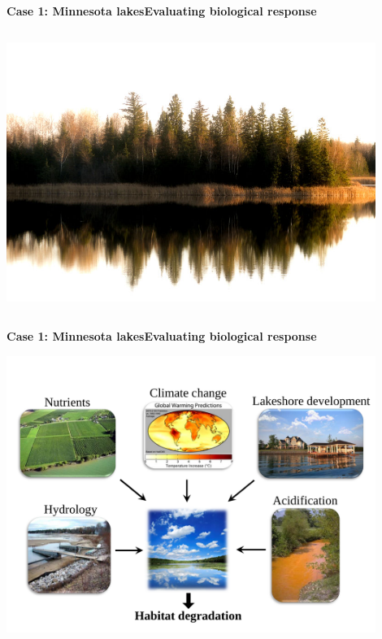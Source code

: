 \documentclass[serif]{beamer}\usepackage[]{graphicx}\usepackage[]{color}
\begin{document}
\begin{frame}{\textbf{Case 1: Minnesota lakes}}{\textbf{Evaluating biological response}}
\begin{columns}
\begin{column}{0.5\textwidth}
\begin{center}
\includegraphics[width=0.9\textwidth]{fig/mn_lake.jpg}
\end{center}
\end{column}
\end{columns}
\end{frame}

\begin{frame}{\textbf{Case 1: Minnesota lakes}}{\textbf{Evaluating biological response}}
\centerline{\includegraphics[width=0.9\textwidth]{fig/stressors.pdf}}
\end{frame}
\end{document}
